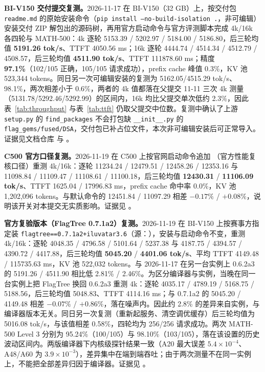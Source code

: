 \documentclass[11pt,a4paper]{ctexart}
\begin{document}
\begin{enumerate}[label=（\arabic*）,leftmargin=3em]
{\sloppy{} \item \textbf{BI-V150 交付提交复测。}2026-11-17 在 BI-V150（32 GB）上，按交付包 \texttt{readme.md} 的原始安装命令（\texttt{pip install --no-build-isolation .}，非可编辑）安装交付 ZIP 解包出的源码树，再用官方启动命令与官方评测脚本完成 4k/16k 各四轮与 MATH-500：4k 逐轮 5153.39 / 5202.97 / 5184.00 / 5186.80，后三轮均值 \textbf{5191.26 tok/s}、TTFT 4050.56 ms；16k 逐轮 4444.74 / 4514.34 / 4512.79 / 4508.57，后三轮均值 \textbf{4511.90 tok/s}、TTFT 111878.60 ms；精度 \textbf{97.1\%}（102/105 正确，105/105 请求成功），prefix cache 峰值 0.3\%，KV 池 523,344 tokens。同日另一次可编辑安装的复测为 5162.05/4515.29 tok/s、98.1\%，两次相差小于 0.6\%，两者的 4k 值都落在父提交 11-11 三次 4k 测量（5131.78/5292.46/5292.99）的区间内，16k 均比父提交单次低约 2.3\%，因此表~\ref{tab:throughput} 与表~\ref{tab:ttft} 仍取父提交中位数。复测中确认了上游 \texttt{setup.py} 的 \texttt{find\_packages} 不会打包缺 \texttt{\_\_init\_\_.py} 的 \texttt{flag\_gems/fused/DSA}，交付包已补占位文件，本次非可编辑安装后可正常导入。证据见文档仓库  与 。
\item \textbf{C500 官方口径复测。}2026-11-19 在 C500 上按官网启动命令追加 （官方性能复核口径）重测 4k/16k：逐轮 11234.24 / 12479.51 / 12458.26 / 12353.16 与 11098.84 / 11109.47 / 11108.61 / 11100.18，后三轮均值 \textbf{12430.31} / \textbf{11106.09 tok/s}、TTFT 1625.04 / 17996.83 ms，prefix cache 命中率 0.0\%，KV 池 1,202,096 tokens。与默认命令的 12451.84 / 11097.29 相差 $-0.17\%$ / $+0.08\%$，说明该开关对本提交无实质影响。证据见 。

\item \textbf{官方复验版本（FlagTree 0.7.1a2）复测。}2026-11-19 在 BI-V150 上按赛事方指定装 \texttt{flagtree==0.7.1a2+iluvatar3.6}（源：），安装与启动命令不变，重测 4k/16k：逐轮 4048.35 / 4796.58 / 5101.64 / 5237.38 与 4187.75 / 4394.57 / 4390.72 / 4417.88，后三轮均值 \textbf{5045.20} / \textbf{4401.06 tok/s}、平均 TTFT 4149.48 / 115735.63 ms，KV 池 522{,}032 tokens。与 2026-11-17 在另一台实例上 0.6.2a3 的 5191.26 / 4511.90 相比低 2.81\% / 2.46\%。为区分编译器与实例，当晚在同一台实例上把 FlagTree 换回 0.6.2a3 重测 4k：逐轮 4035.17 / 4789.19 / 5168.75 / 5188.56，后三轮均值 5048.83、TTFT 4114.16 ms；与 0.7.1a2 的 5045.20 / 4149.48 相差 $-0.07\%$ / $+0.86\%$，落在噪声内。因此约 2.8\% 的差异来自实例，与编译器版本无关。同日另一次复测（重新起服务、清空调优缓存）后三轮均值为 5016.08 tok/s，与该值相差 0.58\%，四轮均为 256/256 请求成功。两次 MATH-500 Level 3 分别为 95.24\%（100/105）与 98.10\%（103/105），落在该设置的历史波动区间内。两版编译器下内核级探针结果一致（A20 最大误差 $5.4\times10^{-4}$、A48/A60 为 $3.9\times10^{-3}$），差异集中在端到端吞吐；由于两次测量不在同一实例上，不能把全部差异归因于编译器。证据见 。
\par}
\end{enumerate}
\end{document}
